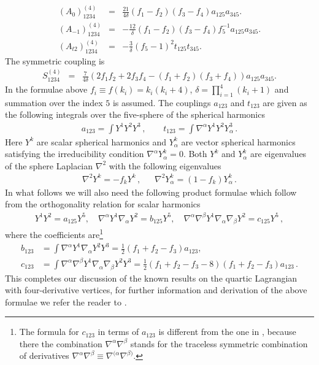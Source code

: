 \documentclass[12pt,a4paper]{article}
\def\de{\delta }
\numberwithin{equation}{section}
\newcommand{\bea}{\begin{eqnarray}}
\newcommand{\eea}{\end{eqnarray}}
\newcommand{\bal}{\begin{equation}\begin{aligned}}
\newcommand{\eal}{\end{aligned}\end{equation}}
\def\la{\label}
\def\a {\alpha}
\def\b {\beta}
\def\na{{\nabla}}
\def\a {\alpha}
\def\b {\beta}
\def\la{\label}
\begin{document}
\bea
(A_0)^{(4)}_{1234}&=&\frac{21}{4\de}(f_1-f_2)(f_3-f_4)
 a_{125}a_{345}.\nonumber\\
(A_{-1})^{(4)}_{1234}&=&-\frac{12}{\de}(f_1-f_2)(f_3-f_4)
 f_5^{-1}a_{125}a_{345}.\nonumber\\
(A_{t2})^{(4)}_{1234}&=&-\frac{3}{\de}(f_5-1)^2t_{125}t_{345}.
\nonumber
\eea
The symmetric coupling is 
\bea
\nonumber
S_{1234}^{(4)}&=&
\frac{7}{4\de}\left( 2f_1f_2+2f_3f_4-(f_1+f_2)(f_3+f_4)\right)
 a_{125}a_{345}.\nonumber
\eea
In the formulae above $f_i\equiv f(k_i)=k_i(k_i+4)$, $\delta=\prod_{i=1}^4(k_i+1)$ and summation over the index $5$ 
is assumed. The couplings $a_{123}$ and $t_{123}$ are given as the following integrals over the five-sphere of the spherical harmonics 
\bea
a_{123}=\int Y^1Y^2Y^3\, , ~~~~~~~~~t_{123}=\int \nabla^{\a} Y^1 Y^2 Y^3_{\alpha}\, .
\eea
Here $Y^k$ are scalar spherical harmonics and $Y^k_{\a}$ are vector spherical harmonics satisfying the irreducibility condition $\nabla^{\a}Y_{\a}^k=0$. 
Both $Y^k$ and $Y_{\a}^k$ are eigenvalues of the sphere Laplacian $\nabla^2$ with the following eigenvalues
\bea
\la{Laplacian}
\nabla^2Y^k=-f_k Y^k\, ,~~~~~~~\nabla^2Y_{\alpha}^k=(1-f_k)Y_{\alpha}^k\, . 
\eea 
In what follows we will also need the following product formulae which follow from the orthogonality relation for scalar harmonics
\bea
Y^1Y^2=a_{125}Y^5,\quad \na^\a Y^1\na_\a Y^2=b_{125}Y^5,\quad
\na^\a\na^\b Y^1\na_\a\na_\b Y^2=c_{125}Y^5\,,
\la{rel1}
\eea
where the coefficients are\footnote{The formula for $c_{123}$ in terms of $a_{123}$ is different from the one in \cite{Arutyunov:1999fb}, because there
the combination $ \na^{\a}\na^{\b}$ stands for the traceless symmetric combination of derivatives $ \na^{\a}\na^{\b}\equiv \na^{(\a}\na^{\b)}$.}
\bal
\la{bc}
b_{123}&=\int \na^{\a}Y^{1}\na_{\a}Y^{2}Y^{3}
=\frac{1}{2}(f_1+f_2-f_3)a_{123}, \\
c_{123}&=\int \na^{\a}\na^{\b}Y^{1}\na_{\a}\na_{\b}Y^{2}Y^{3}=
\frac{1}{2}(f_1+f_2-f_3-8)(f_1+f_2-f_3) a_{123}\, .
\eal
This completes our discussion of the known results on the quartic Lagrangian with four-derivative vertices, for further information and derivation of the above formulae 
we refer the reader to \cite{Arutyunov:1999fb}.
\end{document}
